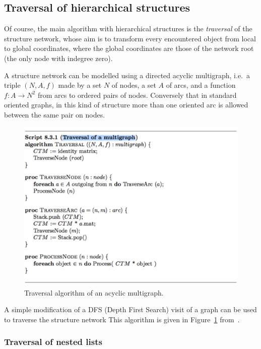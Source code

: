 \documentclass[11pt,oneside]{article}    %
\begin{document}
\subsection{Traversal of hierarchical structures}

Of course, the main algorithm with hierarchical structures is the \emph{traversal} of the structure network, whose aim is to transform every encountered object from local to global coordinates, where the global coordinates are those of the network root (the only node with indegree zero).

A structure network can be modelled using a directed acyclic multigraph, i.e.~a triple $(N,A,f)$
made by a set $N$ of nodes, a set $A$ of arcs, and a function $f:A \to N^2$ from arcs to ordered pairs of nodes. Conversely that in standard oriented graphs, in this kind of structure more than one oriented arc is allowed between the same pair on nodes.

\begin{figure}[htbp] %
   \centering
   \includegraphics[width=0.8\linewidth]{images/traversal} 
   \caption{Traversal algorithm of an acyclic multigraph.}
   \label{fig:traversal}
\end{figure}

A simple modification of a DFS (Depth First Search) visit of a graph can be used to traverse the structure network This algorithm is given in Figure~\ref{fig:traversal} from~\cite{Paoluzzi2003a}. 

\subsubsection{Traversal of nested lists}
\end{document}
